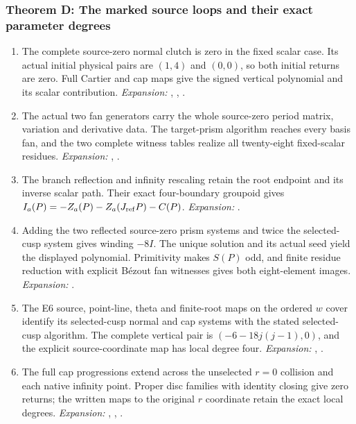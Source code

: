 \subsubsection*{Theorem D: The marked source loops and their exact parameter degrees}
\begin{enumerate}[label=\arabic*.,leftmargin=*]

\item\hypertarget{step-IV-D-1}{} The complete source-zero normal clutch is zero in the fixed
scalar case. Its actual initial physical pairs are $(1,4)$ and
$(0,0)$, so both initial returns are zero. Full Cartier and cap
maps give the signed vertical polynomial and its scalar contribution.
\textit{Expansion:} , , .

\item\hypertarget{step-IV-D-2}{} The actual two fan generators carry the whole source-zero
period matrix, variation and derivative data. The target-prism
algorithm reaches every basis fan, and the two complete witness
tables realize all twenty-eight fixed-scalar residues.
\textit{Expansion:} , .

\item\hypertarget{step-IV-D-3}{} The branch reflection and infinity rescaling retain the root
endpoint and its inverse scalar path. Their exact four-boundary
groupoid gives $I_a(P)=-Z_a(P)-Z_a(J_{\rm ref}P)-C(P)$.
\textit{Expansion:} .

\item\hypertarget{step-IV-D-4}{} Adding the two reflected source-zero prism systems and twice
the selected-cusp system gives winding $-8I$. The unique solution
and its actual seed yield the displayed polynomial. Primitivity
makes $S(P)$ odd, and finite residue reduction with explicit
B\'ezout fan witnesses gives both eight-element images.
\textit{Expansion:} .

\item\hypertarget{step-IV-D-5}{} The E6 source, point-line, theta and finite-root maps on the
ordered $w$ cover identify its selected-cusp normal and cap systems
with the stated selected-cusp algorithm. The complete vertical pair
is $(-6-18j(j-1),0)$, and the explicit source-coordinate map has
local degree four.
\textit{Expansion:} , .

\item\hypertarget{step-IV-D-6}{} The full cap progressions extend across the unselected
$r=0$ collision and each native infinity point. Proper disc
families with identity closing give zero returns; the written
maps to the original $r$ coordinate retain the exact local degrees.
\textit{Expansion:} , , .

\end{enumerate}

